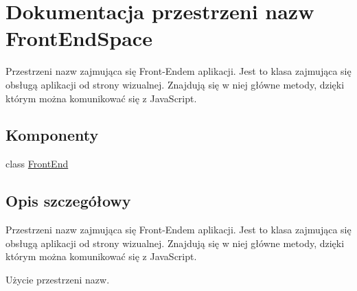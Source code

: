 \hypertarget{namespace_front_end_space}{}\section{Dokumentacja przestrzeni nazw Front\+End\+Space}
\label{namespace_front_end_space}


Przestrzeni nazw zajmująca się Front-\/\+Endem aplikacji. Jest to klasa zajmująca się obsługą aplikacji od strony wizualnej. Znajdują się w niej główne metody, dzięki którym można komunikować się z Java\+Script.  


\subsection*{Komponenty}
\begin{DoxyCompactItemize}
\item 
class \hyperlink{class_front_end_space_1_1_front_end}{Front\+End}
\end{DoxyCompactItemize}


\subsection{Opis szczegółowy}
Przestrzeni nazw zajmująca się Front-\/\+Endem aplikacji. Jest to klasa zajmująca się obsługą aplikacji od strony wizualnej. Znajdują się w niej główne metody, dzięki którym można komunikować się z Java\+Script. 

Użycie przestrzeni nazw. 